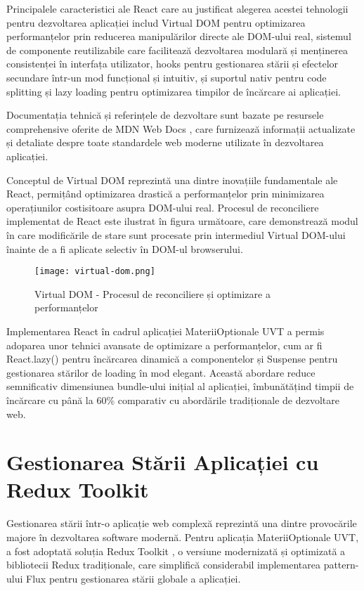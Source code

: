 \documentclass[12pt,a4paper]{report}
\begin{document}
Principalele caracteristici ale React care au justificat alegerea acestei tehnologii pentru dezvoltarea aplicației includ Virtual DOM pentru optimizarea performanțelor prin reducerea manipulărilor directe ale DOM-ului real, sistemul de componente reutilizabile care facilitează dezvoltarea modulară și menținerea consistenței în interfața utilizator, hooks pentru gestionarea stării și efectelor secundare într-un mod funcțional și intuitiv, și suportul nativ pentru code splitting și lazy loading pentru optimizarea timpilor de încărcare ai aplicației.

Documentația tehnică și referințele de dezvoltare sunt bazate pe resursele comprehensive oferite de MDN Web Docs \cite{mdn-web-docs}, care furnizează informații actualizate și detaliate despre toate standardele web moderne utilizate în dezvoltarea aplicației.

Conceptul de Virtual DOM reprezintă una dintre inovațiile fundamentale ale React, permițând optimizarea drastică a performanțelor prin minimizarea operațiunilor costisitoare asupra DOM-ului real. Procesul de reconciliere implementat de React este ilustrat în figura următoare, care demonstrează modul în care modificările de stare sunt procesate prin intermediul Virtual DOM-ului înainte de a fi aplicate selectiv în DOM-ul browserului.

\begin{figure}[H]
\centering
\texttt{[image: virtual-dom.png]}
\caption{Virtual DOM - Procesul de reconciliere și optimizare a performanțelor}
\label{fig:virtual-dom}
\end{figure}

Implementarea React în cadrul aplicației MateriiOptionale UVT a permis adoparea unor tehnici avansate de optimizare a performanțelor, cum ar fi React.lazy() pentru încărcarea dinamică a componentelor și Suspense pentru gestionarea stărilor de loading în mod elegant. Această abordare reduce semnificativ dimensiunea bundle-ului inițial al aplicației, îmbunătățind timpii de încărcare cu până la 60\% comparativ cu abordările tradiționale de dezvoltare web.

\section{Gestionarea Stării Aplicației cu Redux Toolkit}

Gestionarea stării într-o aplicație web complexă reprezintă una dintre provocările majore în dezvoltarea software modernă. Pentru aplicația MateriiOptionale UVT, a fost adoptată soluția Redux Toolkit \cite{redux-toolkit}, o versiune modernizată și optimizată a bibliotecii Redux tradiționale, care simplifică considerabil implementarea pattern-ului Flux pentru gestionarea stării globale a aplicației.
\end{document}
